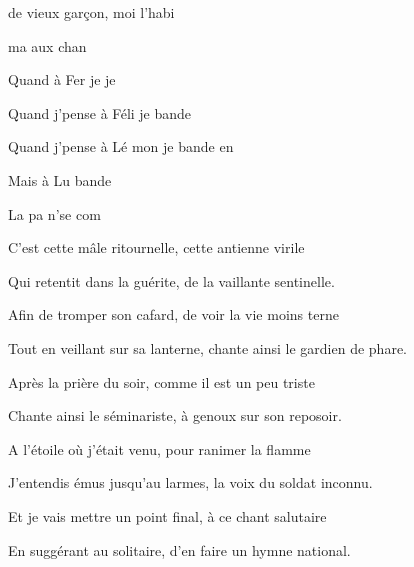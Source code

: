 

\zs
{} de vieux garçon,
moi  l'habi

 ma
aux   chan 
\ks

\zr 
Quand  à Fer
je  je 

Quand j'pense à Féli
je bande 

Quand j'pense à Lé
mon  je bande en

Mais  à Lu
  bande 

La  pa n'se com  ~~~ 
\kr

\zs
C'est cette mâle ritournelle,
cette antienne virile 

Qui retentit dans la guérite,
de la vaillante sentinelle.
\ks

\zr \kr

\zs
Afin de tromper son cafard,
de voir la vie moins terne 

Tout en veillant sur sa lanterne,
chante ainsi le gardien de phare.
\ks

\zr \kr

\zs
Après la prière du soir,
comme il est un peu triste 

Chante ainsi le séminariste,
à genoux sur son reposoir.
\ks

\zr \kr

\zs
A l'étoile où j'était venu,
pour ranimer la flamme 

J'entendis émus jusqu'au larmes,
la voix du soldat inconnu.
\ks

\zr \kr

\zs
Et je vais mettre un point final,
à ce chant salutaire 

En suggérant au solitaire,
d'en faire un hymne national.
\ks

\zr \kr

\kp
